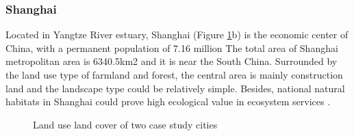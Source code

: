\subsubsection{Shanghai}
Located in Yangtze River estuary, Shanghai (Figure \ref{lulc}b) is the economic center of China, with a permanent population of 7.16 million The total area of Shanghai metropolitan area is 6340.5km2 and it is near the South China. Surrounded by the land use type of farmland and forest, the central area is mainly construction land and the landscape type could be relatively simple. Besides, national natural habitats in Shanghai could prove high ecological value in ecosystem services \parencite{bing_spatial_2021}.\\
\begin{figure}[h]
\centering
{}
\quad
{}
\caption{Land use land cover of two case study cities}
\label{lulc}
\end{figure}
